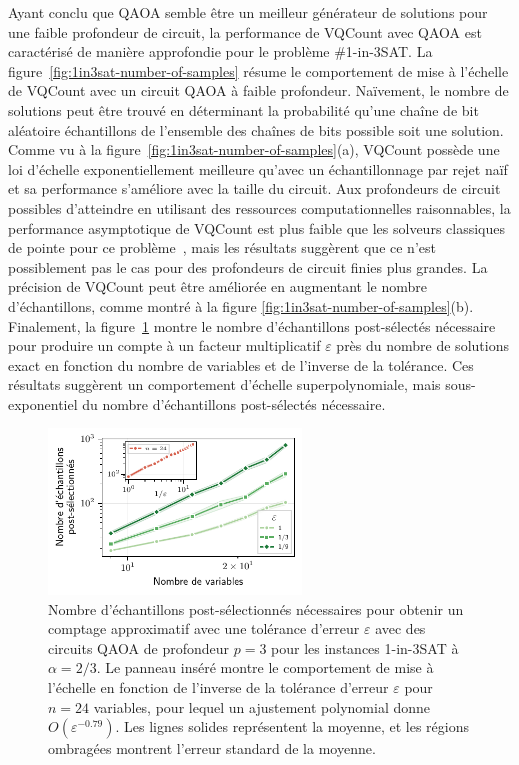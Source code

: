 Ayant conclu que QAOA semble être un meilleur générateur de solutions pour une faible profondeur de circuit, la performance de VQCount avec QAOA est caractérisé de manière approfondie pour le problème \#1-in-3SAT. La figure~\ref{fig:1in3sat-number-of-samples} résume le comportement de mise à l'échelle de VQCount avec un circuit QAOA à faible profondeur. Naïvement, le nombre de solutions peut être trouvé en déterminant la probabilité qu'une chaîne de bit aléatoire échantillons de l'ensemble des chaînes de bits possible soit une solution. Comme vu à la figure~\ref{fig:1in3sat-number-of-samples}(a), VQCount possède une loi d'échelle exponentiellement meilleure qu'avec un échantillonnage par rejet naïf et sa performance s'améliore avec la taille du circuit. Aux profondeurs de circuit possibles d'atteindre en utilisant des ressources computationnelles raisonnables, la performance asymptotique de VQCount est plus faible que les solveurs classiques de pointe pour ce problème~\cite{kourtisFastCountingTensor2019}, mais les résultats suggèrent que ce n'est possiblement pas le cas pour des profondeurs de circuit finies plus grandes. La précision de VQCount peut être améliorée en augmentant le nombre d'échantillons, comme montré à la figure \ref{fig:1in3sat-number-of-samples}(b). Finalement, la figure~\ref{fig:1in3sat-scaling} montre le nombre d'échantillons post-sélectés nécessaire pour produire un compte à un facteur multiplicatif $\varepsilon$ près du nombre de solutions exact en fonction du nombre de variables et de l'inverse de la tolérance. Ces résultats suggèrent un comportement d'échelle superpolynomiale, mais sous-exponentiel du nombre d'échantillons post-sélectés nécessaire. 


\begin{figure}[H]
    \centering
    \includegraphics[width=0.6\textwidth]{figures/1in3sat-scaling.pdf}
    \caption[Comportement d'échelle du nombre d'échantillons post-sélectés pour \#1-in-3SAT]{Nombre d'échantillons post-sélectionnés nécessaires pour obtenir un comptage approximatif avec une tolérance d'erreur $\varepsilon$ avec des circuits QAOA de profondeur $p=3$ pour les instances 1-in-3SAT à $\alpha=2/3$. Le panneau inséré montre le comportement de mise à l'échelle en fonction de l'inverse de la tolérance d'erreur $\varepsilon$ pour $n=24$ variables, pour lequel un ajustement polynomial donne $O(\varepsilon^{-0.79})$. Les lignes solides représentent la moyenne, et les régions ombragées montrent l'erreur standard de la moyenne.}
    \label{fig:1in3sat-scaling}
\end{figure}

